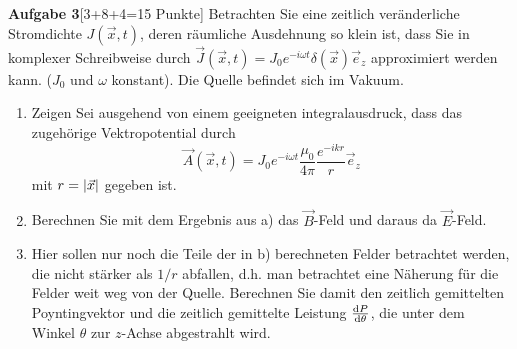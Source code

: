 \newpage
\textbf{Aufgabe 3}\hfill[3+8+4=15 Punkte]
Betrachten Sie eine zeitlich veränderliche Stromdichte $J(\vec x,t)$, deren
räumliche Ausdehnung so klein ist, dass Sie in komplexer Schreibweise durch
$\vec J(\vec x,t)=J_0 e^{-i\omega t}\delta(\vec x)\vec e_z$ approximiert
werden kann. ($J_0$ und $\omega$ konstant). Die Quelle befindet sich 
im Vakuum.
\begin{enumerate}[label=\alph*)]
  \item Zeigen Sei ausgehend von einem geeigneten integralausdruck, dass
    das zugehörige Vektropotential durch
    \begin{equation*}
      \vec A(\vec x, t)
      =J_0 e^{-i\omega t}\frac{\mu_0}{4\pi}\frac{e^{-ikr}}{r}\vec e_z
    \end{equation*}
    mit $r=\abs{\vec x}$ gegeben ist.

  \item Berechnen Sie mit dem Ergebnis aus a) das $\vec B$-Feld und
    daraus da $\vec E$-Feld.

  \item Hier sollen nur noch die Teile der in b) berechneten Felder
    betrachtet werden, die nicht stärker als $1/r$ abfallen, d.h. man
    betrachtet eine Näherung für die Felder weit weg von der Quelle.
    Berechnen Sie damit den zeitlich gemittelten Poyntingvektor und
    die zeitlich gemittelte Leistung $\dv {P}{\theta}$, die unter dem
    Winkel $\theta$ zur $z$-Achse abgestrahlt wird.
\end{enumerate}


